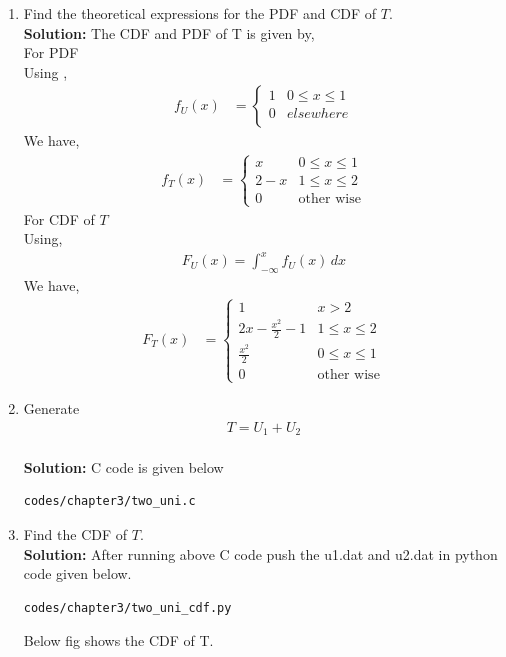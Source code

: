 \documentclass[journal,15pt,twocolumn]{IEEEtran}
\newcommand{\solution}{\noindent \textbf{Solution: }}
\begin{document}
\begin{enumerate}
\item Find the theoretical expressions for the PDF and CDF of $T$.\\
\solution The CDF and PDF of T is given by, \\
  For PDF \\
  Using ,
 \begin{align}
	f_U(x) &= 
	\begin{cases}
	1 &  0 \le x \le  1
	\\
	0 & elsewhere
	\\
	\end{cases}
 \end{align}
 We have,
\begin{align}
	f_T(x) &=
	\begin{cases}
		x & 0 \le x \le 1\\
		2-x & 1 \le x \le 2\\
		0 & \text{other wise}
	\end{cases}
\end{align}
For CDF of $T$ \\
Using,
\begin{align} 
 F_{U}(x)= \int_{-\infty}^{x} f_{U}(x)\,dx
\end{align}
We have,
\begin{align}
	F_T(x) &=
	\begin{cases} 
            1 & x > 2\\
            2x-\frac{x^2}{2}-1 & 1 \le x \le 2\\
            \frac{x^2}{2} & 0 \le x \le 1\\
		0 & \text{other wise}
	\end{cases}
\end{align}
\item Generate 
	\begin{align}
		T = U_1+U_2
	\end{align}\\
\solution C code is given below  
\begin{lstlisting}
codes/chapter3/two_uni.c
\end{lstlisting}
\item Find the CDF of $T$.\\
\solution After running above C code push the u1.dat and u2.dat in python code given below.
\begin{lstlisting}
codes/chapter3/two_uni_cdf.py
\end{lstlisting}
Below fig shows the CDF of T.
\begin{figure}[H]

\end{figure}
\end{enumerate}
\end{document}
